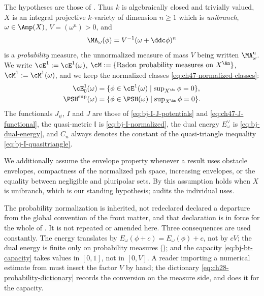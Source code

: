 The hypotheses are those of .
Thus $k$ is algebraically closed and trivially valued, $X$ is an
integral projective $k$-variety of dimension $n\ge1$ which is
\emph{unibranch}, $\omega\in\Amp(X)$, $V=(\omega^n)>0$, and
\[
 \MA_\omega(\phi)=V^{-1}(\omega+\ddc\phi)^n
\]
is a \emph{probability} measure, the unnormalized measure of mass $V$
being written $\MA^{\mathrm u}_\omega$.  We write $\cE^1:=\cE^1(\omega)$,
$\cM:=\{\hbox{Radon probability measures on }X^{\An}\}$,
$\cM^1:=\cM^1(\omega)$, and we keep the normalized classes
\eqref{eq:ch47-normalized-classes}:
\[
 \begin{aligned}
  \cE^1_0(\omega)
   &=\{\phi\in\cE^1(\omega)\mid\textstyle\sup_{X^{\An}}\phi=0\},\\
  \PSH^{\sup}(\omega)
   &=\{\phi\in\PSH(\omega)\mid\textstyle\sup_{X^{\An}}\phi=0\}.
 \end{aligned}
\]
The functionals $J_\psi$, $I$ and $J$ are those of
\eqref{eq:bj-I-J-potentials} and \eqref{eq:ch47-J-functional}, the
quasi-metric $\mathbb I$ is \eqref{eq:bj-I-normalized}, the dual energy
$E^\vee_\omega$ is \eqref{eq:bj-dual-energy}, and $C_n$ always denotes
the constant of the quasi-triangle inequality
\eqref{eq:bj-I-quasitriangle}.

We additionally assume the envelope property whenever a result uses
obstacle envelopes, compactness of the normalized psh space, increasing
envelopes, or the equality between negligible and pluripolar sets.  By
 this
assumption holds when $X$ is unibranch, which is our standing hypothesis;
 audits the individual uses.

\begin{warning}{The probability normalization is inherited, not redeclared}
\label{warn:ch48-normalization}
 declared a departure from the global
convention of the front matter, and that declaration is in force for the
whole of .  It is not repeated
or amended here.  Three consequences are used constantly.  The energy
translates by $E_\omega(\phi+c)=E_\omega(\phi)+c$, not by $cV$; the
dual energy is finite only on probability measures
(); and the capacity
\eqref{eq:bj-bt-capacity} takes values in $[0,1]$, not in $[0,V]$.  A
reader importing a numerical estimate from
 must insert the factor $V$ by hand; the
dictionary \eqref{eq:ch28-probability-dictionary} records the conversion on
the measure side, and  does it for the capacity.
\end{warning}

